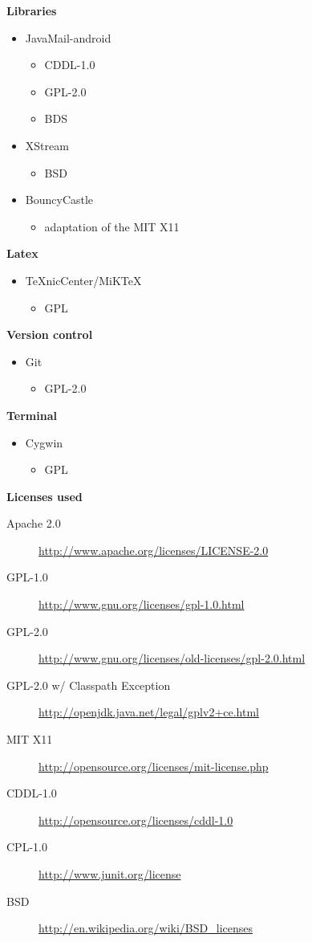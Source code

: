 	{\bf Libraries}
		\begin{itemize}
			\item JavaMail-android
				\begin{itemize}
					\item CDDL-1.0
					\item GPL-2.0
					\item BDS
				\end{itemize}
			\item XStream
				\begin{itemize}
					\item BSD
				\end{itemize}
			\item BouncyCastle
				\begin{itemize}
					\item adaptation of the MIT X11
				\end{itemize}
		\end{itemize}
	{\bf Latex}
		\begin{itemize}
			\item TeXnicCenter/MiKTeX
				\begin{itemize}
					\item GPL
				\end{itemize}
		\end{itemize}
	{\bf Version control}
		\begin{itemize}
			\item Git
				\begin{itemize}
					\item GPL-2.0
				\end{itemize}
		\end{itemize}
	{\bf Terminal}
		\begin{itemize}
			\item Cygwin
				\begin{itemize}
					\item GPL
				\end{itemize}
		\end{itemize}
	{\bf Licenses used}
	\begin{description}
		\item[Apache 2.0] \url{http://www.apache.org/licenses/LICENSE-2.0}
		\item[GPL-1.0] \url{http://www.gnu.org/licenses/gpl-1.0.html}
		\item[GPL-2.0] \url{http://www.gnu.org/licenses/old-licenses/gpl-2.0.html}
		\item[GPL-2.0 w/ Classpath Exception] \url{http://openjdk.java.net/legal/gplv2+ce.html}
		\item[MIT X11] \url{http://opensource.org/licenses/mit-license.php}
		\item[CDDL-1.0] \url{http://opensource.org/licenses/cddl-1.0}
		\item[CPL-1.0] \url{http://www.junit.org/license}
		\item[BSD] \url{http://en.wikipedia.org/wiki/BSD\_licenses}
	\end{description}
